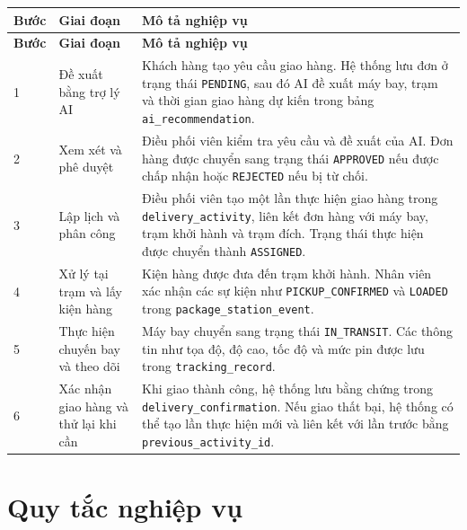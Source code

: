 \renewcommand{\arraystretch}{1.2}
\begin{longtable}{|p{1.2cm}|p{4cm}|p{8.5cm}|}
\hline
\textbf{Bước} & \textbf{Giai đoạn} & \textbf{Mô tả nghiệp vụ} \\ \hline
\endfirsthead

\hline
\textbf{Bước} & \textbf{Giai đoạn} & \textbf{Mô tả nghiệp vụ} \\ \hline
\endhead

1 &
Đề xuất bằng trợ lý AI &
Khách hàng tạo yêu cầu giao hàng. Hệ thống lưu đơn ở trạng thái
\texttt{PENDING}, sau đó AI đề xuất máy bay, trạm và thời gian giao hàng
dự kiến trong bảng \texttt{ai\_recommendation}. \\ \hline

2 &
Xem xét và phê duyệt &
Điều phối viên kiểm tra yêu cầu và đề xuất của AI. Đơn hàng được chuyển
sang trạng thái \texttt{APPROVED} nếu được chấp nhận hoặc
\texttt{REJECTED} nếu bị từ chối. \\ \hline

3 &
Lập lịch và phân công &
Điều phối viên tạo một lần thực hiện giao hàng trong
\texttt{delivery\_activity}, liên kết đơn hàng với máy bay, trạm khởi hành
và trạm đích. Trạng thái thực hiện được chuyển thành
\texttt{ASSIGNED}. \\ \hline

4 &
Xử lý tại trạm và lấy kiện hàng &
Kiện hàng được đưa đến trạm khởi hành. Nhân viên xác nhận các sự kiện
như \texttt{PICKUP\_CONFIRMED} và \texttt{LOADED} trong
\texttt{package\_station\_event}. \\ \hline

5 &
Thực hiện chuyến bay và theo dõi &
Máy bay chuyển sang trạng thái \texttt{IN\_TRANSIT}. Các thông tin như
tọa độ, độ cao, tốc độ và mức pin được lưu trong
\texttt{tracking\_record}. \\ \hline

6 &
Xác nhận giao hàng và thử lại khi cần &
Khi giao thành công, hệ thống lưu bằng chứng trong
\texttt{delivery\_confirmation}. Nếu giao thất bại, hệ thống có thể tạo
lần thực hiện mới và liên kết với lần trước bằng
\texttt{previous\_activity\_id}. \\ \hline

\end{longtable}
\renewcommand{\arraystretch}{1}
\section{Quy tắc nghiệp vụ}
\label{s:rules} 

